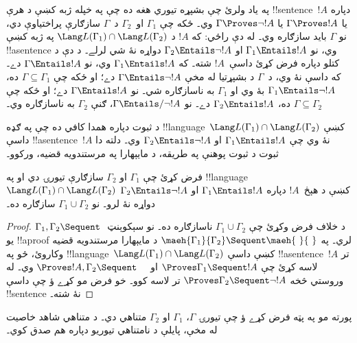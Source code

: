 \documentclass[../../../include/open-logic-section]{subfiles}
\begin{document}
په ياد ولرئ چې بشپړه تيوري هغه ده چې په خپله ژبه کښې د هرې
!!{sentence}~$!A$ دپاره يا $\Gamma \Proves !A$ يا
$\Gamma \Proves \lnot !A$ وي۔ ځکه چې $\Gamma_1$ او~$\Gamma_2$
د~$\Gamma$ سازګارې پراختياوې دي، نو $\Gamma$ بايد سازګاره وي۔
له دې راځي: که $!A$ د $\Lang L(\Gamma_1) \cap \Lang
L(\Gamma_2)$ په ژبه کښې !!a{sentence} وي، نو $\Gamma_1 \Entails !A$
او $\Gamma_2 \Entails \lnot !A$ دواړه نۀ شي لرلے۔ د دې د کتلو
دپاره فرض کړئ داسې~$!A$ شته۔ که $\Gamma_1 \Entails !A$ وي، نو
$\Gamma \Entails !A$ دے۔ که داسې نۀ وي، د~$\Gamma$ د بشپړتيا
له مخې $\Gamma \Entails \lnot !A$ دے؛ او ځکه چې
$\Gamma \subseteq \Gamma_1$ ده، $\Gamma_1 \Entails \lnot !A$
بۀ وي او $\Gamma_1$ به ناسازګاره شي۔ نو $\Gamma \Entails !A$
دے؛ او ځکه چې $\Gamma
\subseteq \Gamma_2$ ده، $\Gamma_2 \Entails !A$ دے۔ نو
$\Gamma \Entails/
\lnot !A$، ګنې $\Gamma_2$ به ناسازګاره وي۔

د ثبوت دپاره همدا کافي ده چې په ګډه !!{language}~$\Lang L(\Gamma_1) \cap \Lang L(\Gamma_2)$
کښې داسې !!a{sentence}~$!A$ نۀ وي چې $\Gamma_1
\Entails !A$ او $\Gamma_2 \Entails \lnot !A$ وي۔ دلته دا
ثبوت د ثبوت پوهنې په طريقه، د مايېهارا په مرستندويه قضيه، ورکوو۔

\begin{thm}
فرض کړئ چې $\Gamma_1$ او $\Gamma_2$ سازګارې تيورۍ دي او په
!!{language} $\Lang L(\Gamma_1) \cap \Lang L(\Gamma_2)$ کښې
د هېڅ~$!A$ دپاره $\Gamma_1 \Entails !A$ او
$\Gamma_2 \Entails \lnot !A$ دواړه نۀ لرو۔ نو
$\Gamma_1 \cup \Gamma_2$ سازګاره ده۔
\end{thm}

\begin{proof}
  د خلاف فرض وکړئ چې $\Gamma_1 \cup \Gamma_2$ ناسازګاره ده۔
  نو سېکوېنټ $\Gamma_1, \Gamma_2 \Sequent \ $ يو
  !!a{proof} لري۔ په $\maeh{\Gamma_1}{\Gamma_2}
  \Sequent \maeh{\ }{\ }$ د مايېهارا مرستندويه قضيه وکاروئ،
  څو په !!{language}~$\Lang L(\Gamma_1) \cap \Lang L(\Gamma_2)$
  کښې داسې !!a{sentence}~$!A$ تر لاسه کړئ چې
  $\Proves \Gamma_1 \Sequent !A$ او $\Proves !A, \Gamma_2 \Sequent
  \quad$ وي۔ له وروستي څخه $\Proves \Gamma_2 \Sequent \lnot !A$
  تر لاسه کوو۔ خو فرض مو کړے ؤ چې داسې !!{sentence} نۀ شته۔
\end{proof}

پورته مو په پټه فرض کړے ؤ چې تيورۍ $\Gamma$، $\Gamma_1$ او
$\Gamma_2$ متناهي دي۔ د متناهي شاهد خاصيت له مخې، پايلې د
نامتناهي تيوريو دپاره هم صدق کوي۔
\end{document}
